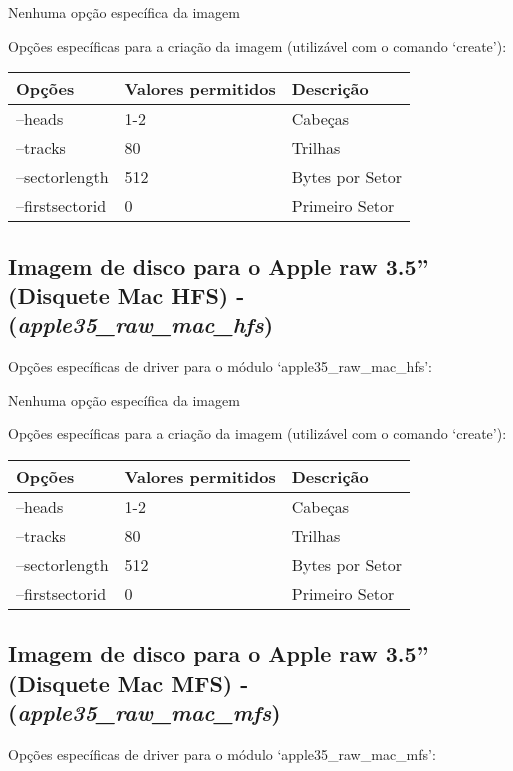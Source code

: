 \documentclass[letterpaper,10pt,brazil]{sphinxmanual}
\begin{document}
Nenhuma opção específica da imagem

Opções específicas para a criação da imagem (utilizável com o comando `create'):

\noindent\begin{tabulary}{\linewidth}{|L|L|L|}
\hline

Opções
&
Valores permitidos
&
Descrição
\\
\hline
--heads
&
1-2
&
Cabeças
\\
\hline
--tracks
&
80
&
Trilhas
\\
\hline
--sectorlength
&
512
&
Bytes por Setor
\\
\hline
--firstsectorid
&
0
&
Primeiro Setor
\\
\hline\end{tabulary}



\subsection{Imagem de disco para o Apple raw 3.5'' (Disquete Mac HFS) - (\emph{apple35\_raw\_mac\_hfs})}
\label{tools/imgtool:imagem-de-disco-para-o-apple-raw-3-5-disquete-mac-hfs-apple35-raw-mac-hfs}
Opções específicas de driver para o módulo `apple35\_raw\_mac\_hfs':

Nenhuma opção específica da imagem

Opções específicas para a criação da imagem (utilizável com o comando `create'):

\noindent\begin{tabulary}{\linewidth}{|L|L|L|}
\hline

Opções
&
Valores permitidos
&
Descrição
\\
\hline
--heads
&
1-2
&
Cabeças
\\
\hline
--tracks
&
80
&
Trilhas
\\
\hline
--sectorlength
&
512
&
Bytes por Setor
\\
\hline
--firstsectorid
&
0
&
Primeiro Setor
\\
\hline\end{tabulary}



\subsection{Imagem de disco para o Apple raw 3.5'' (Disquete Mac MFS) - (\emph{apple35\_raw\_mac\_mfs})}
\label{tools/imgtool:imagem-de-disco-para-o-apple-raw-3-5-disquete-mac-mfs-apple35-raw-mac-mfs}
Opções específicas de driver para o módulo `apple35\_raw\_mac\_mfs':
\end{document}
